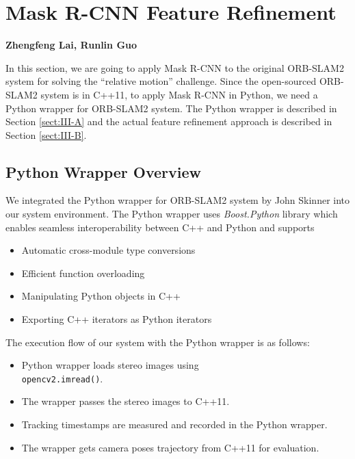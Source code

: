 \documentclass[letterpaper, 10 pt, conference]{IEEEtran}
\begin{document}
\section{Mask R-CNN Feature Refinement} \label{sect:\thesection}
\begin{center}\textbf{Zhengfeng Lai, Runlin Guo}\end{center}

In this section, we are going to apply Mask R-CNN to the original ORB-SLAM2
system for solving the ``relative motion'' challenge. Since the open-sourced
ORB-SLAM2 system is in C++11, to apply Mask R-CNN in Python, we need a Python
wrapper for ORB-SLAM2 system. The Python wrapper is described in Section
\ref{sect:III-A} and the actual feature refinement approach is described in
Section \ref{sect:III-B}. 

\subsection{Python Wrapper Overview} \label{sect:\thesubsection}
We integrated the Python wrapper for ORB-SLAM2 system by John Skinner
\cite{python} into our system environment. The Python wrapper uses
\textit{Boost.Python} library which enables seamless interoperability between
C++ and Python and supports
\begin{itemize}
    \item Automatic cross-module type conversions
    \item Efficient function overloading
    \item Manipulating Python objects in C++
    \item Exporting C++ iterators as Python iterators
\end{itemize}

The execution flow of our system with the Python wrapper is as follows: 
\begin{itemize}
    \item Python wrapper loads stereo images using \\
    \texttt{opencv2.imread()}.
    \item The wrapper passes the stereo images to C++11.
    \item Tracking timestamps are measured and recorded in the Python wrapper.
    \item The wrapper gets camera poses trajectory from C++11 for evaluation.
\end{itemize}
\end{document}
